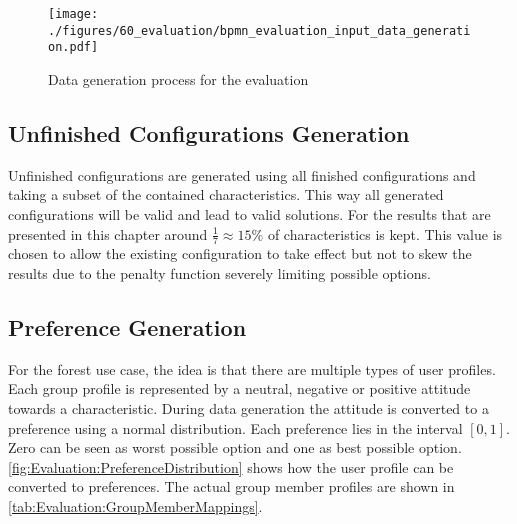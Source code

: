 \begin{figure}
    \centering
    \texttt{[image: ./figures/60\_evaluation/bpmn\_evaluation\_input\_data\_generation.pdf]}
    \caption{Data generation process for the evaluation}
    \label{fig:Evaluation:GeneratingDataProcess}
\end{figure}

\subsection{Unfinished Configurations Generation}

Unfinished configurations are generated using all finished configurations and taking a subset of the contained characteristics. This way all generated configurations will be valid and lead to valid solutions. For the results that are presented in this chapter around $\frac{1}{7} \approx 15\%$ of characteristics is kept. This value is chosen to allow the existing configuration to take effect but not to skew the results due to the penalty function severely limiting possible options.

\subsection{Preference Generation}

For the forest use case, the idea is that there are multiple types of user profiles. Each group profile is represented by a neutral, negative or positive attitude towards a characteristic. During data generation the attitude is converted to a preference using a normal distribution. Each preference lies in the interval $[0,1]$. Zero can be seen as worst possible option and one as best possible option.  \autoref{fig:Evaluation:PreferenceDistribution} shows how the user profile can be converted to preferences. The actual group member profiles are shown in \autoref{tab:Evaluation:GroupMemberMappings}.

